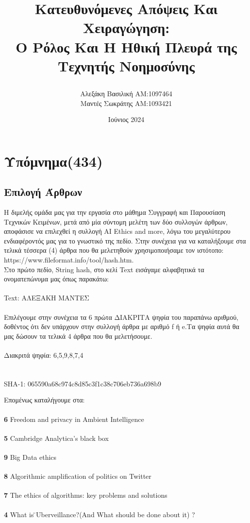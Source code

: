 \documentclass{report}
\title{
\textbf{Κατευθυνόμενες Απόψεις Και Χειραγώγηση:\\
O Ρόλος Και Η Ηθική Πλευρά της Τεχνητής Νοημοσύνης}
\author{Αλεξάκη Βασιλική ΑΜ:1097464 \\Μαντές Σωκράτης ΑΜ:1093421} }
\date{\LARGE \session Ιούνιος 2024}
\begin{document}
\maketitle

\tableofcontents
{}
\chapter{Υπόμνημα(434)}
\section{Επιλογή Άρθρων}
Η διμελής ομάδα μας για την εργασία στο μάθημα Συγγραφή και Παρουσίαση Τεχνικών Κειμένων, μετά από μία σύντομη μελέτη των δύο συλλογών άρθρων, αποφάσισε να επιλεχθεί η συλλογή AI Ethics and more, λόγω του μεγαλύτερου ενδιαφέροντός μας για το γνωστικό της πεδίο. 
Στην συνέχεια για να καταλήξουμε στα τελικά τέσσερα (4) άρθρα που θα μελετηθούν χρησιμοποιήσαμε τον ιστότοπο:
 https://www.fileformat.info/tool/hash.htm.
 \\Στο πρώτο πεδίο, String hash,  στο κελί Text εισάγαμε αλφαβητικά τα ονοματεπώνυμα μας όπως παρακάτω: \\
\\Text: ΑΛΕΞΑΚΗ ΜΑΝΤΕΣ\\
\\Επιλέγουμε στην συνέχεια τα 6 πρώτα ΔΙΑΚΡΙΤΑ ψηφία του παραπάνω αριθμού, δοθέντος ότι δεν υπάρχουν στην συλλογή άρθρα με αριθμό f ή e.Τα ψηφία αυτά θα μας δώσουν τα τελικά 4 άρθρα που θα μελετήσουμε. \\
\\Διακριτά ψηφία:  6,5,9,8,7,4 \\\\
 \\ SHA-1: 065590a68c974c8d85c3f1c38c706eb736a698b9 

\newline
Επομένως καταλήγουμε στα:\\\\
\textbf6 Freedom and privacy in Ambient Intelligence  \\\\
\textbf5  Cambridge Analytica’s black box \\ \\
\textbf9  Big Data ethics \\\\
\textbf8  Algorithmic amplification of politics on Twitter \\\\
\textbf7  The ethics of algorithms: key problems and solutions \\\\
\textbf4  What is  ̈Uberveillance?(And What should be done about it) ? \\
\end{document}
